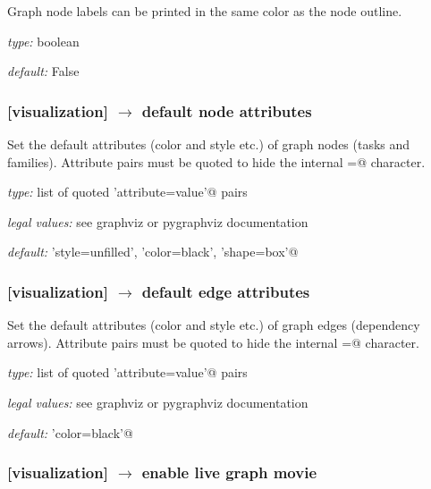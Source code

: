 Graph node labels can be printed in the same color as the node outline.

\begin{myitemize}
    \item {\em type:} boolean
    \item {\em default:} False
\end{myitemize}


\subsubsection[default node attributes]{[visualization] $\rightarrow$ default node attributes}

Set the default attributes (color and style etc.) of graph nodes (tasks and families).
Attribute pairs must be quoted to hide the internal \lstinline@=@ character.

\begin{myitemize}
    \item {\em type:} list of quoted \lstinline@'attribute=value'@ pairs
    \item {\em legal values:} see graphviz or pygraphviz documentation
    \item {\em default:} \lstinline@'style=unfilled', 'color=black', 'shape=box'@
\end{myitemize}

\subsubsection[default edge attributes]{[visualization] $\rightarrow$ default edge attributes}

Set the default attributes (color and style etc.) of graph edges
(dependency arrows).  Attribute pairs must be quoted to hide the
internal \lstinline@=@ character.
\begin{myitemize}
    \item {\em type:} list of quoted \lstinline@'attribute=value'@ pairs
    \item {\em legal values:} see graphviz or pygraphviz documentation
    \item {\em default:} \lstinline@'color=black'@
\end{myitemize}

\subsubsection[enable live graph movie]{[visualization] $\rightarrow$ enable live graph movie}

